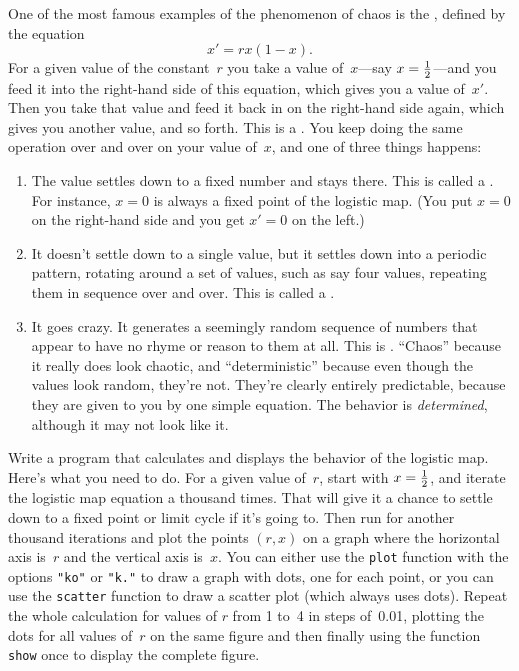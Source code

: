 \documentclass[12pt]{article}
\begin{document}
\begin{exercises}
\exskip One of the most famous examples of the phenomenon of chaos is the
, defined by the equation
\begin{equation}
x' = rx(1-x).
\end{equation}
For a given value of the constant~$r$ you take a value of~$x$---say
$x=\tfrac12$---and you feed it into the right-hand side of this equation,
which gives you a value of~$x'$.  Then you take that value and feed it back
in on the right-hand side again, which gives you another value, and so
forth.  This is a .  You keep doing the same
operation over and over on your value of~$x$, and one of three things
happens: {\renewcommand{\labelenumi}{\arabic{enumi}.\ }
\begin{enumerate}\setlength{\itemsep}{0pt}
\item The value settles down to a fixed number and stays there.  This is
  called a .  For instance, $x=0$ is always a
  fixed point of the logistic map.  (You put $x=0$ on the right-hand side
  and you get $x'=0$ on the left.)
\item It doesn't settle down to a single value, but it settles down into a
  periodic pattern, rotating around a set of values, such as say four
  values, repeating them in sequence over and over.  This is called a
  .
\item It goes crazy.  It generates a seemingly random sequence of numbers
  that appear to have no rhyme or reason to them at all.  This is
  .  ``Chaos'' because it really does look
  chaotic, and ``deterministic'' because even though the values look
  random, they're not.  They're clearly entirely predictable, because they
  are given to you by one simple equation.  The behavior is
  \emph{determined}, although it may not look like it.
\end{enumerate}}
Write a program that calculates and displays the behavior of the logistic
map.  Here's what you need to do.  For a given value of~$r$, start with
$x=\tfrac12$, and iterate the logistic map equation a thousand times.  That
will give it a chance to settle down to a fixed point or limit cycle if
it's going to.  Then run for another thousand iterations and plot the
points $(r,x)$ on a graph where the horizontal axis is~$r$ and the vertical
axis is~$x$.  You can either use the \verb|plot| function with the options
\verb|"ko"| or \verb|"k."| to draw a graph with dots, one for each point,
or you can use the \verb|scatter| function to draw a scatter plot (which
always uses dots).  Repeat the whole calculation for values of $r$ from 1
to~4 in steps of~0.01, plotting the dots for all values of~$r$ on the same
figure and then finally using the function \verb|show| once to display the
complete figure.


\end{exercises}
\end{document}
